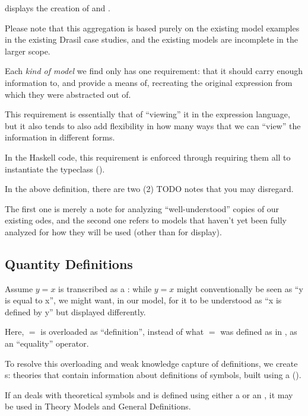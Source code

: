  displays the creation of \ModelKind{} and
\ModelKinds{}.

Please note that this aggregation is based purely on the existing model examples
in the existing Drasil case studies, and the existing models are incomplete in
the larger scope.

Each \textit{kind of model} we find only has one requirement: that it should
carry enough information to, and provide a means of, recreating the original
expression from which they were abstracted out of.

This requirement is essentially that of ``viewing'' it in the expression
language, but it also tends to also add flexibility in how many ways that we can
``view'' the information in different forms.

In the Haskell code, this requirement is enforced through requiring them all to
instantiate the \Express{} typeclass ().

\currentModelKindsHaskell{}

In the above \ModelKinds{} definition, there are two (2) TODO notes that you may
disregard.

The first one is merely a note for analyzing ``well-understood'' copies of our
existing \acsp{ode}, and the second one refers to models that haven't yet been
fully analyzed for how they will be used (other than for display).

\subsection{Quantity Definitions}

\currentQDefinitionHaskell{}

Assume \(y = x\) is transcribed as a \RelationConcept{}: while \(y = x\) might
conventionally be seen as ``y is equal to x'', we might want, in our model, for
it to be understood as ``x is defined by y'' but displayed differently.

Here, \(=\) is overloaded as ``definition'', instead of what \(=\) was defined
as in \Expr{}, as an ``equality'' operator.

To resolve this overloading and weak knowledge capture of definitions, we create
\EquationalModel{}s: theories that contain information about definitions of
symbols, built using a \QDefinition{} ().

If an \EquationalModel{} deals with theoretical symbols and is defined using
either a \ModelExpr{} or an \Expr{}, it may be used in Theory Models and General
Definitions.


